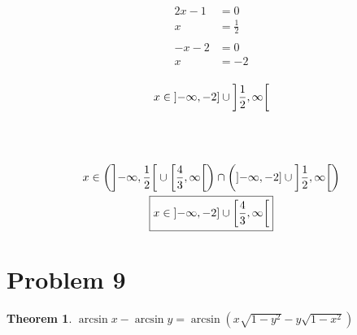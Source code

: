\documentclass{article}
\newtheorem*{theorem*}{Theorem}
\begin{document}
\begin{itemize}
\begin{minipage}[t]{.45\textwidth}
\begin{align*}
		\\
		2x-1&=0 \\
		x&=\frac{1}{2} \\
		\\
		-x-2&=0 \\
		x&=-2 \\
	\end{align*}
	\centering
	\[
		x\in
		\interval[scaled,open left]{-\infty}{-2}\cup
		\interval[scaled,open left,open right]{\frac{1}{2}}{\infty}
	\] \\
	\end{minipage}
	\begin{gather*}
		\\
		x\in
		\left(\interval[scaled,open left,open right]{-\infty}{\frac{1}{2}}\cup
		\interval[scaled,open right]{\frac{4}{3}}{\infty}\right)
		\cap\left(\interval[scaled,open left]{-\infty}{-2}\cup
		\interval[scaled,open left,open right]{\frac{1}{2}}{\infty}\right) \\
		\boxed{x\in
		\interval[scaled,open left]{-\infty}{-2}\cup
		\interval[scaled,open right]{\frac{4}{3}}{\infty}} \\
	\end{gather*}
\end{itemize}

\pagebreak


\section*{Problem 9}
\begin{theorem*}$
	\arcsin x-\arcsin y=
	\arcsin\left(x\sqrt{1-y^2}-y\sqrt{1-x^2}\right)
$\end{theorem*}
	
\end{document}
